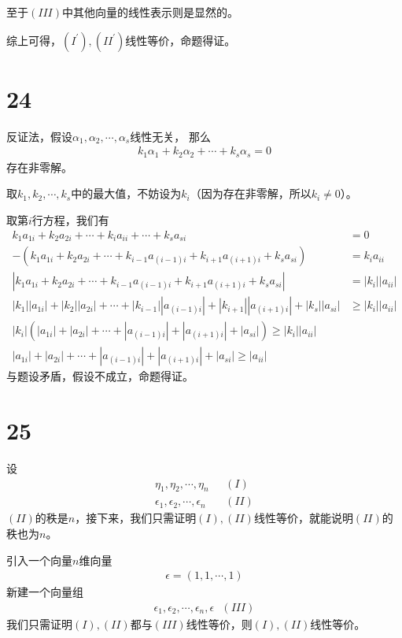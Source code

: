 \documentclass{article}
\begin{document}
至于$(III)$中其他向量的线性表示则是显然的。

综上可得，$(I^\prime), (II^\prime)$线性等价，命题得证。

\section*{24}

反证法，假设$\alpha_1, \alpha_2, \cdots, \alpha_s$线性无关，
那么
\begin{align*}
  k_1 \alpha_1 + k_2 \alpha_2 + \cdots + k_s \alpha_s = 0
\end{align*}
存在非零解。

取$k_1, k_2, \cdots, k_s$中的最大值，不妨设为$k_i$（因为存在非零解，所以$k_i \neq 0$）。

取第$i$行方程，我们有
\begin{align*}
  k_1 a_{1i} + k_2 a_{2i} + \cdots + k_ia_{ii} + \cdots + k_s a_{si}                                           & = 0                \\
  - (k_1 a_{1i} + k_2 a_{2i} + \cdots + k_{i - 1} a_{(i - 1)i} + k_{i+1} a_{(i + 1)i} + k_s a_{si})            & = k_ia_{ii}        \\
  |k_1 a_{1i} + k_2 a_{2i} + \cdots + k_{i-1} a_{(i - 1)i} + k_{i+1} a_{(i + 1)i} + k_s a_{si}|                & = |k_i||a_{ii}|    \\
  |k_1||a_{1i}| + |k_2||a_{2i}| + \cdots + |k_{i-1}||a_{(i - 1)i}| + |k_{i + 1}||a_{(i + 1)i}| + |k_s||a_{si}| & \geq |k_i||a_{ii}| \\
  |k_i|(|a_{1i}| + |a_{2i}| + \cdots + |a_{(i - 1)i}| + |a_{(i + 1)i}| + |a_{si}|) \geq |k_i||a_{ii}|                               \\
  |a_{1i}| + |a_{2i}| + \cdots + |a_{(i - 1)i}| + |a_{(i + 1)i}| + |a_{si}| \geq |a_{ii}|
\end{align*}
与题设矛盾，假设不成立，命题得证。

\section*{25}

设
\begin{align*}
  \eta_1, \eta_2, \cdots, \eta_n             & \ \ \ (I)  \\
  \epsilon_1, \epsilon_2, \cdots, \epsilon_n & \ \ \ (II)
\end{align*}
$(II)$的秩是$n$，接下来，我们只需证明$(I),(II)$线性等价，就能说明$(II)$的秩也为$n$。

引入一个向量$n$维向量
\begin{align*}
  \epsilon = (1, 1, \cdots, 1)
\end{align*}
新建一个向量组
\begin{align*}
  \epsilon_1, \epsilon_2, \cdots, \epsilon_n, \epsilon \ \ \ (III)
\end{align*}
我们只需证明$(I),(II)$都与$(III)$线性等价，则$(I),(II)$线性等价。
\end{document}
